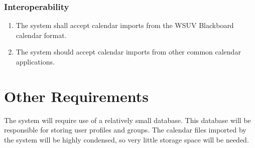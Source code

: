\documentclass{scrreprt}
\begin{document}
\subsection{Interoperability}
\begin{enumerate}
\item The system shall accept calendar imports from the WSUV Blackboard calendar
format.
\item The system should accept calendar imports from other common calendar
applications.
\end{enumerate}

\chapter{Other Requirements}
The system will require use of a relatively small database. This database will be responsible for storing user profiles and groups. The calendar files imported by the system will be highly condensed, so very little storage space will be needed.
\end{document}
